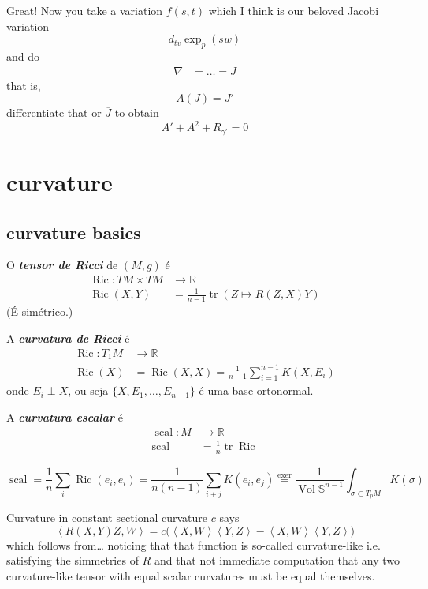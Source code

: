 Great! Now you take a variation \(f(s,t)\) which I think is our beloved Jacobi variation
\[d_{tv}\operatorname{exp}_p(sw)\]
and do
\begin{align*}
\nabla &= \ldots=J
\end{align*}
that is,
\[A(J)=J'\]
differentiate that or \(\overline{J}\) to obtain
\[A'+A^2+R_{\gamma'}=0\]

\section{curvature}

\subsection{curvature basics}

O \textit{\textbf{tensor de Ricci}} de \((M,g)\) é
\begin{align*}
	\operatorname{Ric}: TM \times TM &\longrightarrow  \mathbb{R}\\
	 \operatorname{Ric}(X,Y)&= \frac{1}{n-1}\operatorname{tr}(Z  \mapsto R(Z,X)Y)
\end{align*}
(É simétrico.)

A \textit{\textbf{curvatura de Ricci}} é
\begin{align*}
	\operatorname{Ric}: T_1M &\longrightarrow \mathbb{R} \\
	\operatorname{Ric}(X) &=\operatorname{Ric}(X,X)=\frac{1}{n-1}\sum_{i=1}^{n-1}K(X,E_i)
\end{align*}
onde \(E_i \perp X\), ou seja \(\{X,E_1,\ldots,E_{n-1}\}\) é uma base ortonormal.

A \textit{\textbf{curvatura escalar}} é
\begin{align*}
	\operatorname{scal}: M &\longrightarrow \mathbb{R} \\
	\operatorname{scal} &=\frac{1}{n}\operatorname{tr}\operatorname{Ric} 
\end{align*}

\begin{exercise}\leavevmode
\[\operatorname{scal}=\frac{1}{n}\sum_{i}\operatorname{Ric}(e_i,e_i)=\frac{1}{n(n-1)}\sum_{i+j}K(e_i,e_j)\overset{\text{exer} }{=}\frac{1}{\operatorname{Vol}\mathbb{S}^{n-1}}\int_{\sigma \subset T_pM}K(\sigma)\]
\end{exercise}

Curvature in constant sectional curvature \(c\) says
\[\left<R(X,Y)Z,W\right>=c\Big(\left<X,W\right>\left<Y,Z\right>-\left<X,W\right>\left<Y,Z\right>\Big)\]
which follows from… noticing that that function is so-called curvature-like i.e. satisfying the simmetries of \(R\) and that not immediate computation that any two curvature-like tensor with equal scalar curvatures must be equal themselves.

